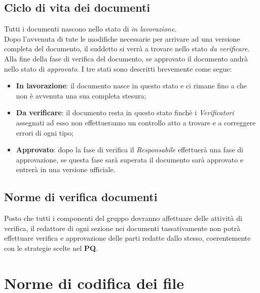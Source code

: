 \documentclass{scalatekids-article}
\begin{document}
\subsection{Ciclo di vita dei documenti}
Tutti i documenti nascono nello stato di \textit{in lavorazione}.\\
Dopo l'avvenuta di tute le modifiche necessarie per arrivare ad una versione completa del documento, il suddetto si verrà a trovare nello stato \textit{da verificare}.\\
Alla fine della fase di verifica del documento, se approvato il documento andrà nello stato di \textit{approvato}.
I tre stati sono descritti brevemente come segue:
\begin{itemize}
\item \textbf{In lavorazione}: il documento nasce in questo stato e ci rimane fino a che non è avvenuta una sua completa stesura;
\item \textbf{Da verificare}: il documento resta in questo stato finchè i \textit{Verificatori} assegnati ad esso non effettueranno un controllo atto a trovare e a correggere errori di ogni tipo;
\item \textbf{Approvato}: dopo la fase di verifica il \textit{Responsabile} effettuerà una fase di approvazione, se questa fase sarà superata il documento sarà approvato e entrerà in una versione ufficiale.
\end{itemize}

\subsection{Norme di verifica documenti}
Posto che tutti i componenti del gruppo dovranno affettuare delle attività di
verifica, il redattore di ogni sezione nei documenti tassativamente non potrà
effettuare verifica e approvazione delle parti redatte dallo stesso,
coerentemente con le strategie scelte nel \textbf{PQ}.

\section{Norme di codifica dei file}
\end{document}
